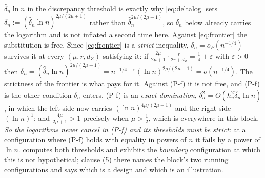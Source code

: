 \begin{proposition}
\begin{enumerate}
$\hat\delta_n\ln n$ in the discrepancy threshold is exactly why \eqref{eq:deltalog} sets
$\delta_n:=(\hat\delta_n\ln n)^{2\mu/(2\mu+1)}$ rather than $\hat\delta_n^{2\mu/(2\mu+1)}$, so
$\delta_n$ below already carries the logarithm and is not inflated a second time here.
Against \eqref{eq:frontier} the substitution is free. Since \eqref{eq:frontier} is a \emph{strict}
inequality, $\delta_n=o_P(n^{-1/4})$ survives it at every $(\mu,r,d_Z)$ satisfying it:
if $\tfrac{2\mu}{2\mu+1}\cdot\tfrac{r}{2r+d_Z}=\tfrac14+\varepsilon$ with $\varepsilon>0$ then
$\delta_n=(\hat\delta_n\ln n)^{2\mu/(2\mu+1)}=n^{-1/4-\varepsilon}(\ln n)^{2\mu/(2\mu+1)}=o(n^{-1/4})$.
The strictness of the frontier is what pays for it.
Against \textup{(P-f)} it is not free, and \textup{(P-f)} is the other condition $\delta_n$
enters. \textup{(P-f)} is an \emph{exact domination}, $\delta_n^{2}=O(h_u^{2}\hat\delta_n\ln n)$, in
which the left side now carries $(\ln n)^{4\mu/(2\mu+1)}$ and the right side $(\ln n)^{1}$; and
$\tfrac{4\mu}{2\mu+1}>1$ precisely when $\mu>\tfrac12$, which is everywhere in this block. \emph{So the
logarithms never cancel in \textup{(P-f)} and its thresholds must be strict}: at a configuration where
\textup{(P-f)} holds with equality in powers of $n$ it fails by a power of $\ln n$.
 computes both thresholds and exhibits the \emph{boundary} configuration at which
this is not hypothetical; clause (5) there names the block's two running configurations and says which
is a design and which is an illustration.
\end{enumerate}
\end{proposition}


